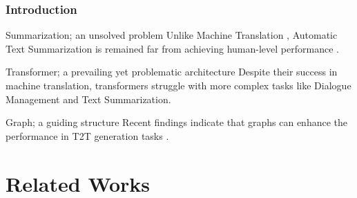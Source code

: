 \documentclass{beamer}
\begin{document}
\begin{frame}
\frametitle{Introduction}

\begin{block}{Summarization; an unsolved problem}
Unlike Machine Translation {\tiny \citep{Popel2020}}, Automatic Text Summarization is remained far from achieving human-level performance {\tiny \citep{summarizationSurvey-waffa-el-kassas}}.
\end{block}

\begin{alertblock}{Transformer; a prevailing yet problematic architecture}
Despite their success in machine translation, transformers struggle with more complex tasks like Dialogue Management and Text Summarization.
\end{alertblock}

\begin{exampleblock}{Graph; a guiding structure}
Recent findings indicate that graphs can enhance the performance in T2T generation tasks {\tiny \citep{GNNBook-ch21-liu}}.
\end{exampleblock}

\end{frame}


\section{Related Works}
\end{document}
